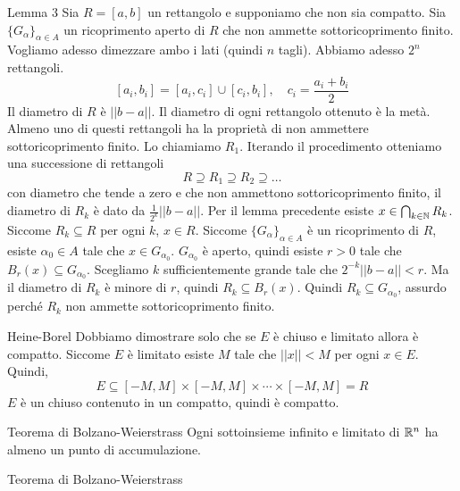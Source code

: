 \documentclass[a4paper]{article}
\begin{document}
\begin{snippetproof}{Lemma 3}
    Sia \(R = [a,b]\) un rettangolo e supponiamo che non sia compatto.
    Sia \(\{G_\alpha\}_{\alpha \in A}\) un ricoprimento aperto di \(R\)
    che non ammette sottoricoprimento finito.
    Vogliamo adesso dimezzare ambo i lati (quindi \(n\) tagli).
    Abbiamo adesso \(2^n\) rettangoli.
    \[
        [a_i, b_i] = [a_i, c_i] \cup [c_i, b_i], \quad
        c_i = \frac{a_i + b_i}{2}
    \]
    Il diametro di \(R\) è \(||b-a||\).
    Il diametro di ogni rettangolo ottenuto è la metà.
    Almeno uno di questi rettangoli ha la proprietà di non ammettere sottoricoprimento finito.
    Lo chiamiamo \(R_1\).
    Iterando il procedimento otteniamo una successione di rettangoli
    \[
        R \supseteq R_1 \supseteq R_2 \supseteq \ldots
    \]
    con diametro che tende a zero e che non ammettono sottoricoprimento finito, il diametro
    di \(R_k\) è dato da \(\frac{1}{2^k} ||b-a||\).
    Per il lemma precedente esiste \(x \in \bigcap_{k\in \mathbb{N}} R_k\).
    Siccome \(R_k \subseteq R\) per ogni \(k\), \(x \in R\).
    Siccome \(\{G_\alpha\}_{\alpha \in A}\) è un ricoprimento di \(R\),
    esiste \(\alpha_0 \in A\) tale che \(x \in G_{\alpha_0}\).
    \(G_{\alpha_0}\) è aperto, quindi esiste \(r > 0\) tale che
    \(B_r(x) \subseteq G_{\alpha_0}\).
    Scegliamo \(k\) sufficientemente grande tale che \(2^{-k} ||b-a|| < r\).
    Ma il diametro di \(R_k\) è minore di \(r\), quindi \(R_k \subseteq B_r(x)\).
    Quindi \(R_k \subseteq G_{\alpha_0}\), assurdo perché \(R_k\) non ammette sottoricoprimento finito.
\end{snippetproof}

\begin{snippetproof}{Heine-Borel}
    Dobbiamo dimostrare solo che se \(E\) è chiuso e limitato allora è compatto.
    Siccome \(E\) è limitato esiste \(M\) tale che \(||x|| < M\) per ogni \(x \in E\).
    Quindi,
    \[
        E \subseteq [-M, M] \times [-M, M] \times \cdots \times [-M, M] = R
    \]
    \(E\) è un chiuso contenuto in un compatto, quindi è compatto.
\end{snippetproof}

\begin{snippettheorem}{Teorema di Bolzano-Weierstrass}
    Ogni sottoinsieme infinito e limitato di \(\mathbb{R}^n\) ha almeno un punto di accumulazione.
\end{snippettheorem}

\begin{snippetproof}{Teorema di Bolzano-Weierstrass}
\end{snippetproof}
\end{document}
